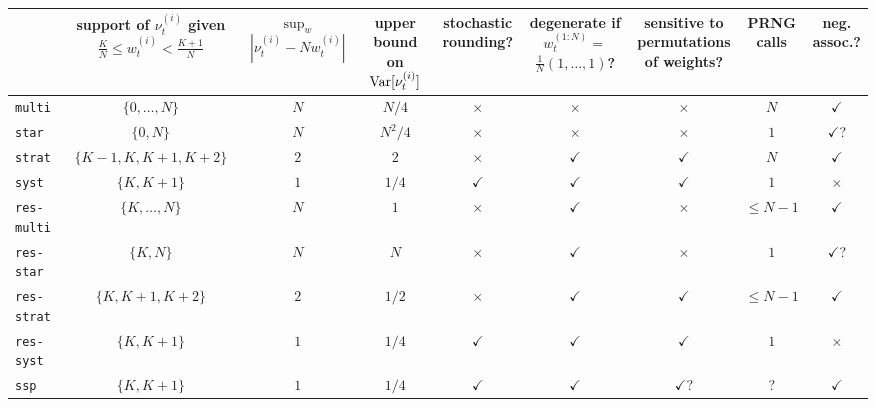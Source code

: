 \begin{landscape}
\begin{table}[ht]
\centering
\begin{tabular}{ l | c c c c c c c c }
\hline\hline
& \thead{support of $\nu_t^{(i)}$ given
            \\ $ \frac{K}{N} \leq w_t^{(i)} < \frac{K+1}{N}$} 
        & \thead{$\sup_w$\\ $|\nu_t^{(i)} - Nw_t^{(i)}|$}
        & \thead{upper\\ bound on \\ $\operatorname{Var}[\nu_t^{(i)}]$}
        & \thead{stochastic\\ rounding?}       
        & \thead{degenerate if\\ $w_t^{(1:N)} =$\\ $\frac{1}{N}(1,\dots,1)$?} 
        & \thead{sensitive to\\ permutations\\ of weights?} 
        & \thead{PRNG\\ calls}
        & \thead{neg.\\ assoc.?} \\
\hline
\texttt{multi} & $\{0,\dots,N\}$ & $N$ & $N/4$ & $\times$ & $\times$ 
        & $\times$ & $N$ & $\checkmark$ \\
\texttt{star} & $\{0, N\}$ & $N$ & $N^2/4$ & $\times$ & $\times$ 
        & $\times$ & $1$ & $\checkmark$? \\
\texttt{strat} & $\{K-1, K, K+1, K+2\}$ & $2$ & $2$ & $\times$ & $\checkmark$ 
        & $\checkmark$ & $N$ & $\checkmark$ \\
\texttt{syst} & $\{K, K+1\}$ & $1$ & $1/4$ & $\checkmark$ & $\checkmark$ 
        & $\checkmark$ & $1$ & $\times$ \\
\texttt{res-multi} & $\{K,\dots,N\}$ & $N$ & $1$ & $\times$ & $\checkmark$ 
        & $\times$ & $\leq N-1$ & $\checkmark$ \\
\texttt{res-star} & $\{K, N\}$ & $N$ & $N$ & $\times$ & $\checkmark$ 
        & $\times$ & $1$ & $\checkmark$? \\
\texttt{res-strat} & $\{K, K+1, K+2\}$ & $2$ & $1/2$ & $\times$ & $\checkmark$ 
        & $\checkmark$ & $\leq N-1$ & $\checkmark$ \\
\texttt{res-syst} & $\{K, K+1\}$ & $1$ & $1/4$ & $\checkmark$ & $\checkmark$ 
        & $\checkmark$ & $1$ & $\times$ \\
\texttt{ssp} & $\{K, K+1\}$ & $1$ & $1/4$ & $\checkmark$ & $\checkmark$ 
        & $\checkmark$? & ? & $\checkmark$ \\

\end{tabular}
\end{table}
\end{landscape}
